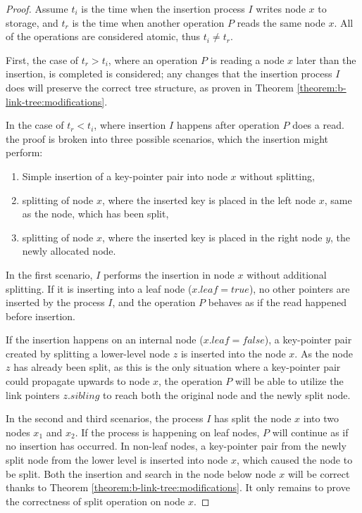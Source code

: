 \begin{proof}
  Assume $t_i$ is the time when the insertion process $I$ writes node $x$ to storage, and $t_r$ is the time when another operation $P$ reads the same node $x$. All of the operations are considered atomic, thus $t_i \neq t_r$.

  First, the case of $t_r > t_i$, where an operation $P$ is reading a node $x$ later than the insertion, is completed is considered; any changes that the insertion process $I$ does will preserve the correct tree structure, as proven in Theorem \ref{theorem:b-link-tree:modifications}.

  In the case of $t_r < t_i$, where insertion $I$ happens after operation $P$ does a read. the proof is broken into three possible scenarios, which the insertion might perform:

  \begin{enumerate}
    \item Simple insertion of a key-pointer pair into node $x$ without splitting,
    \item splitting of node $x$, where the inserted key is placed in the left node $x$, same as the node, which has been split,
    \item splitting of node $x$, where the inserted key is placed in the right node $y$, the newly allocated node.
  \end{enumerate}

  In the first scenario, $I$ performs the insertion in node $x$ without additional splitting. If it is inserting into a leaf node ($x.leaf = true$), no other pointers are inserted by the process $I$, and the operation $P$ behaves as if the read happened before insertion.

  If the insertion happens on an internal node ($x.leaf = false$), a key-pointer pair created by splitting a lower-level node $z$ is inserted into the node $x$. As the node $z$ has already been split, as this is the only situation where a key-pointer pair could propagate upwards to node $x$, the operation $P$ will be able to utilize the link pointers $z.sibling$ to reach both the original node and the newly split node.

  In the second and third scenarios, the process $I$ has split the node $x$ into two nodes $x_1$ and $x_2$. If the process is happening on leaf nodes, $P$ will continue as if no insertion has occurred. In non-leaf nodes, a key-pointer pair from the newly split node from the lower level is inserted into node $x$, which caused the node to be split. Both the insertion and search in the node below node $x$ will be correct thanks to Theorem \ref{theorem:b-link-tree:modifications}. It only remains to prove the correctness of split operation on node $x$.


\end{proof}
